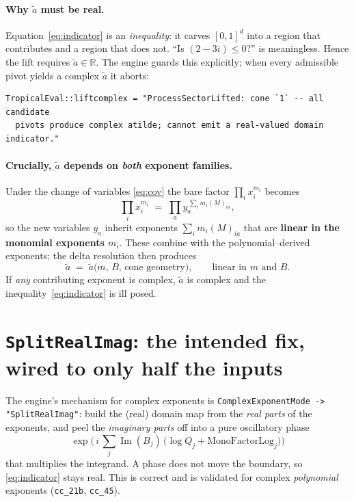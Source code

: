 \documentclass[11pt]{article}
\newcommand{\Imag}{\operatorname{Im}}
\newcommand{\atil}{\tilde{a}}
\newcommand{\code}[1]{\texttt{#1}}
\begin{document}
\paragraph{Why $\atil$ must be real.} Equation~\eqref{eq:indicator} is an
\emph{inequality}: it carves $[0,1]^d$ into a region that contributes and a region
that does not. ``Is $(2-3i)\le 0$?'' is meaningless. Hence the lift requires
$\atil\in\mathbb{R}$. The engine guards this explicitly; when every admissible pivot
yields a complex $\atil$ it aborts:
\begin{lstlisting}
TropicalEval::liftcomplex = "ProcessSectorLifted: cone `1` -- all candidate
  pivots produce complex atilde; cannot emit a real-valued domain indicator."
\end{lstlisting}

\paragraph{Crucially, $\atil$ depends on \emph{both} exponent families.} Under the
change of variables \eqref{eq:cov} the bare factor $\prod_i x_i^{m_i}$ becomes
\begin{equation}
  \prod_i x_i^{m_i}
  \;=\;\prod_a y_a^{\,\sum_i m_i (M)_{ia}},
  \label{eq:monoshift}
\end{equation}
so the new variables $y_a$ inherit exponents $\sum_i m_i (M)_{ia}$ that are
\textbf{linear in the monomial exponents $m_i$}. These combine with the
polynomial--derived exponents; the delta resolution then produces
\begin{equation}
  \atil \;=\; \atil\big(m,\,B,\,\text{cone geometry}\big),
  \qquad\text{linear in } m \text{ and } B .
  \label{eq:atilde}
\end{equation}
If \emph{any} contributing exponent is complex, $\atil$ is complex and the
inequality~\eqref{eq:indicator} is ill posed.

\section{\texttt{SplitRealImag}: the intended fix, wired to only half the inputs}

The engine's mechanism for complex exponents is \code{ComplexExponentMode ->
"SplitRealImag"}: build the (real) domain map from the \emph{real parts} of the
exponents, and peel the \emph{imaginary parts} off into a pure oscillatory phase
\begin{equation}
  \exp\!\Big(\, i\,\textstyle\sum_j \Imag(B_j)\,\big(\log Q_j + \mathrm{MonoFactorLog}_j\big)\Big)
\end{equation}
that multiplies the integrand. A phase does not move the boundary, so
\eqref{eq:indicator} stays real. This is correct and is validated for complex
\emph{polynomial} exponents (\code{cc\_21b}, \code{cc\_45}).
\end{document}
